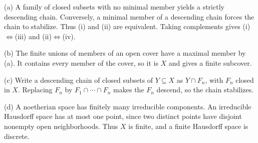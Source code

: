 (a) A family of closed subsets with no minimal member yields a strictly descending chain. Conversely, a minimal member of a descending chain forces the chain to stabilize. Thus (i) and (ii) are equivalent. Taking complements gives (i)$\iff$(iii) and (ii)$\iff$(iv).

(b) The finite unions of members of an open cover have a maximal member by (a). It contains every member of the cover, so it is $X$ and gives a finite subcover.

(c) Write a descending chain of closed subsets of $Y\subseteq X$ as $Y\cap F_n$, with $F_n$ closed in $X$. Replacing $F_n$ by $F_1\cap\cdots\cap F_n$ makes the $F_n$ descend, so the chain stabilizes.

(d) A noetherian space has finitely many irreducible components. An irreducible Hausdorff space has at most one point, since two distinct points have disjoint nonempty open neighborhoods. Thus $X$ is finite, and a finite Hausdorff space is discrete.
